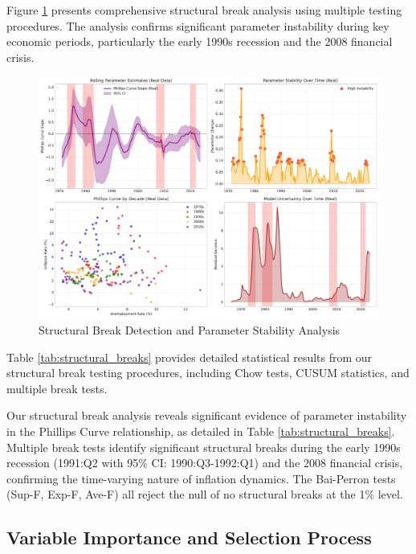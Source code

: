 \documentclass[12pt]{article}
\begin{document}
Figure \ref{fig:structural_breaks} presents comprehensive structural break analysis using multiple testing procedures. The analysis confirms significant parameter instability during key economic periods, particularly the early 1990s recession and the 2008 financial crisis.

\begin{figure}[H]
\centering
\includegraphics[width=\textwidth]{figures/structural_breaks.pdf}
\caption{Structural Break Detection and Parameter Stability Analysis}
\label{fig:structural_breaks}
\end{figure}

Table \ref{tab:structural_breaks} provides detailed statistical results from our structural break testing procedures, including Chow tests, CUSUM statistics, and multiple break tests.



Our structural break analysis reveals significant evidence of parameter instability in the Phillips Curve relationship, as detailed in Table \ref{tab:structural_breaks}. Multiple break tests identify significant structural breaks during the early 1990s recession (1991:Q2 with 95\% CI: 1990:Q3-1992:Q1) and the 2008 financial crisis, confirming the time-varying nature of inflation dynamics. The Bai-Perron tests (Sup-F, Exp-F, Ave-F) all reject the null of no structural breaks at the 1\% level.

\subsection{Variable Importance and Selection Process}
\end{document}
